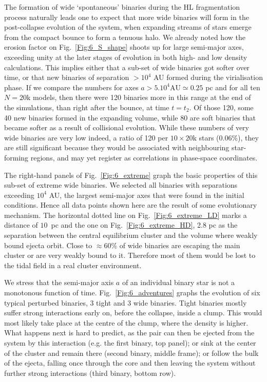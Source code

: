 The formation of wide `spontaneous' binaries during the HL fragmentation process naturally leads one to expect that more wide binaries will form in the post-collapse evolution of the system, when expanding streams of stars emerge from the compact bounce to form a tenuous halo. We already noted how the erosion factor on Fig.~\ref{Fig:6_S_shape} shoots up for large semi-major axes, exceeding unity at the later stages of evolution in both high- and low density calculations. This implies either that a sub-set of wide binaries got softer over time, or that new binaries of separation $> 10^4$ AU formed during the virialisation phase. If we compare the numbers for axes $a > 5.10^4 \textrm{AU} \simeq 0.25$ pc and for all ten $N = 20$k models, then there were 120 binaries more  in this range at the end of the simulations, than right after the bounce, at time $t = t_2$.  Of those 120, some 40 new binaries formed in the expanding volume, while 80 are  soft binaries that became softer as a result of collisional evolution. While these numbers of very wide binaries  are very low indeed, a ratio of 120 per $10 \times 20$k  stars (0.06\%), they are still significant because they would be associated with neighbouring star-forming regions, and  may yet register as correlations in phase-space coordinates. 
  

The right-hand panels of Fig.~\ref{Fig:6_extreme} graph the basic properties of this sub-set of extreme wide binaries. We selected all  binaries with separations exceeding $10^4$ AU, the largest semi-major axes that were found in the initial conditions. Hence all data points shown here are the result of some evolutionary mechanism. The horizontal dotted line on Fig.~\ref{Fig:6_extreme_LD} marks a distance of $10$~pc and the one on Fig.~\ref{Fig:6_extreme_HD}, 2.8 pc as the separation between the central  equilibrium cluster and the volume where weakly bound ejecta orbit. Close to $\approx 60\% $ of wide binaries are escaping the main cluster or are very weakly bound to it. Therefore most of them would be lost to the tidal field in a real cluster environment.  
 

We stress that the semi-major axis $a$ of an individual binary star is not a monotonous function of time. Fig.~\ref{Fig:6_adventures} graphs the evolution of six typical perturbed binaries, 3 tight and 3 wide binaries. Tight binaries mostly suffer strong interactions early on, before the collapse, inside a clump. This would most likely take place at the centre of the clump, where the density is higher. What happens next is hard to predict, as the pair can then be ejected from the system by this interaction (e.g. the first binary, top panel); or  sink at the center of the cluster and remain there (second binary, middle frame); or follow the bulk of the ejecta,  falling once through the core and then leaving the system without further strong interactions  (third binary, bottom row). 

